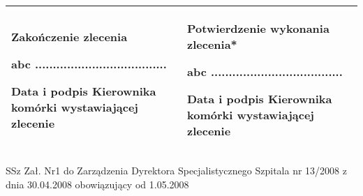 \documentclass[11pt,a4paper]{article}
\begin{document}
\begin{tabularx}{\linewidth}{|X|X|}
\hline
{\footnotesize \textbf{Zakończenie zlecenia}}\newline

abc \hspace{1cm} ..................................... \newline

{\scriptsize Data i podpis Kierownika komórki wystawiającej zlecenie }
&
{\footnotesize \textbf{Potwierdzenie wykonania zlecenia*}}\newline

abc \hspace{1cm} ..................................... \newline

{\scriptsize Data i podpis Kierownika komórki wystawiającej zlecenie }
\\ \hline


\end{tabularx}
\begin{center}
{\scriptsize SSz Zał. Nr1 do Zarządzenia Dyrektora Specjalistycznego Szpitala  nr 13/2008 z dnia 30.04.2008 obowiązujący od 1.05.2008}
\end{center}
\end{document}
